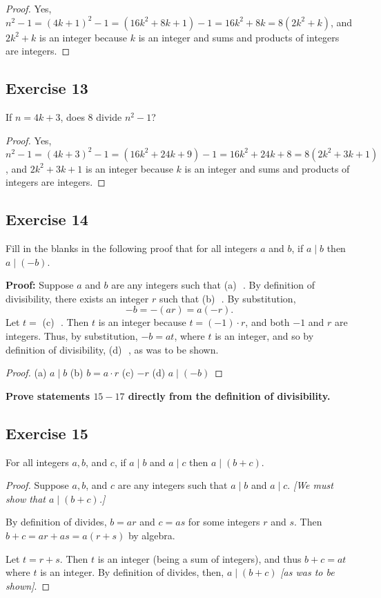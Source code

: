 \documentclass[14pt]{extarticle}
\newcommand{\fbl}{\underline{\hspace{1cm}}\,\,}
\newcommand{\cy}{\color{cyan}}
\begin{document}
\begin{proof}
    Yes, $n^2 - 1 = (4k + 1)^2 - 1 = (16k^2 + 8k + 1) - 1 =
        16k^2 + 8k = 8(2k^2 + k)$, and $2k^2 + k$ is an integer because $k$ is an integer and sums and products of integers are integers.
\end{proof}

\subsection{Exercise 13}
If $n = 4k + 3$, does 8 divide $n^2 - 1$?

\begin{proof}
    Yes, $n^2 - 1 = (4k + 3)^2 - 1 = (16k^2 + 24k + 9) - 1 =
        16k^2 + 24k + 8 = 8(2k^2 + 3k + 1)$, and $2k^2 + 3k + 1$ is an integer because $k$ is an integer and sums and products of integers are integers.
\end{proof}

\subsection{Exercise 14}
Fill in the blanks in the following proof that for all integers $a$ and $b$, if $a \mid b$ then $a \mid (-b)$.

    {\bf Proof:} Suppose $a$ and $b$ are any integers such that
    {\cy (a)} \fbl. By definition of divisibility, there exists an integer $r$ such that {\cy (b)} \fbl. By substitution,
\[
    -b = -(ar) = a(-r).
\]
Let $t = $ {\cy(c)} \fbl. Then $t$ is an integer because $t = (-1)\cdot r$, and both $-1$ and $r$ are integers. Thus, by substitution, $-b = at$, where $t$ is an integer, and so by definition of divisibility, {\cy (d)} \fbl, as was to be shown.

\begin{proof}
    (a) $a \mid b$ (b) $b = a \cdot r$ (c) $-r$ (d) $a \mid (-b)$
\end{proof}

{\bf \cy Prove statements $15-17$ directly from the definition of divisibility.}

\subsection{Exercise 15}
For all integers $a, b$, and $c$, if $a \mid b$ and $a \mid c$ then $a \mid (b + c)$.

\begin{proof}
    Suppose $a, b$, and $c$ are any integers such that $a\mid b$ and $a \mid c$. {\it [We must show that $a \mid (b + c)$.]}

    By definition of divides, $b = ar$ and $c = as$ for some integers $r$ and $s$. Then $b + c = ar + as = a(r + s)$ by algebra.

    Let $t = r + s$. Then $t$ is an integer (being a sum of integers), and thus $b + c = at$ where $t$ is an integer. By definition of divides, then, $a \mid (b + c)$ {\it [as was to be shown]}.
\end{proof}
\end{document}
